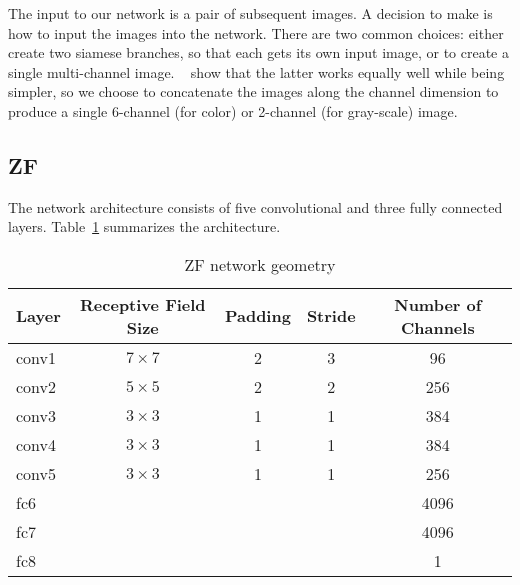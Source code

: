 The input to our network is a pair of subsequent images.  A decision
to make is how to input the images into the network.  There are two
common choices: either create two siamese branches, so that each gets
its own input image, or to create a single multi-channel image.
~\cite{fischer2015flownet} show that the latter works equally well
while being simpler, so we choose to concatenate the images along the
channel dimension to produce a single 6-channel (for color) or
2-channel (for gray-scale) image.

\subsection{ZF}

The network architecture consists of five convolutional and three fully connected layers.  Table~\ref{tab:zf_geometry} summarizes the architecture.

\begin{table}[ht]
  \begin{tabular}{lcccc}
    \toprule
    \textbf{Layer} & \textbf{Receptive Field Size} & \textbf{Padding} & \textbf{Stride} & \textbf{Number of Channels}\\
    \midrule
    conv1&  $7\times 7$& 2& 3&   96\\
    conv2&  $5\times 5$& 2& 2&  256\\
    conv3&  $3\times 3$& 1& 1&  384\\
    conv4&  $3\times 3$& 1& 1&  384\\
    conv5&  $3\times 3$& 1& 1&  256\\
    fc6&               &  &  & 4096\\
    fc7&               &  &  & 4096\\
    fc8&               &  &  &    1\\
  \end{tabular}
  \caption{ZF network geometry}
  \label{tab:zf_geometry}
\end{table}

